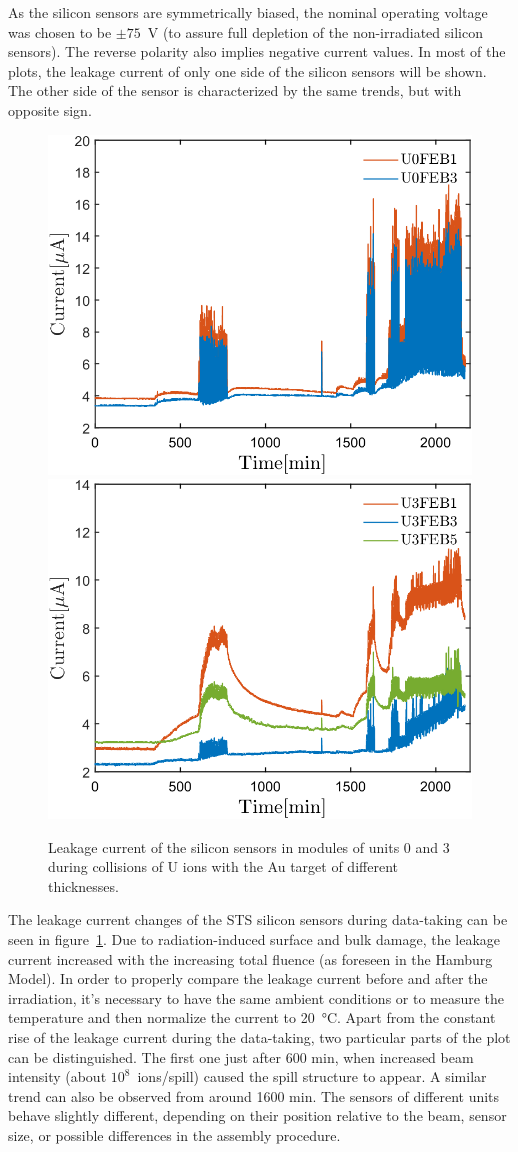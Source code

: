 As the silicon sensors are symmetrically biased, the nominal operating voltage was chosen to be $\pm75$~V (to assure full depletion of the non-irradiated silicon sensors). The reverse polarity also implies negative current values. In most of the plots, the leakage current of only one side of the silicon sensors will be shown. The other side of the sensor is characterized by the same trends, but with opposite sign.

\begin{figure}[!h]
\centering
\includegraphics[width=0.45\columnwidth]{Chapter6/DCS/images/uranium/U0.png}
\includegraphics[width=0.45\columnwidth]{Chapter6/DCS/images/uranium/U3.png}
\caption{Leakage current of the silicon sensors in modules of units 0 and 3 during collisions of U ions with the Au target of different thicknesses.}
\label{fig_msts_LC}
\end{figure}

The leakage current changes of the \gls{STS} silicon sensors during data-taking can be seen in figure~\ref{fig_msts_LC}. Due to radiation-induced surface and bulk damage, the leakage current  increased with the increasing total fluence (as foreseen in the Hamburg Model). In order to properly compare the leakage current before and after the irradiation, it's necessary to have the same ambient conditions or to measure the temperature and then normalize the current to \SI{20}{\celsius}. Apart from the constant rise of the leakage current during the data-taking, two particular parts of the plot can be distinguished. The first one just after 600 min, when increased beam intensity (about $10^{8}$~ions/spill) caused the spill structure to appear. A similar trend can also be observed from around 1600 min. The sensors of different units behave slightly different, depending on their position relative to the beam, sensor size, or possible differences in the assembly procedure.


